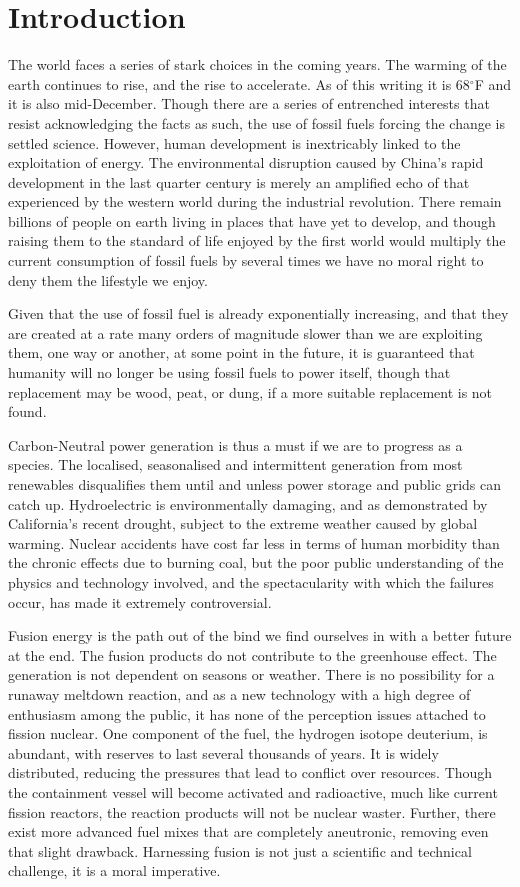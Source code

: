 \chapter{Introduction}
\indent The world faces a series of stark choices in the coming years.  The warming of the earth continues to rise, and the rise to accelerate.  As of this writing it is 68$^{\circ}$F and it is also mid-December.  Though there are a series of entrenched interests that resist acknowledging the facts as such, the use of fossil fuels forcing the change is settled science.  However, human development is inextricably linked to the exploitation of energy.  The environmental disruption caused by China's rapid development in the last quarter century is merely an amplified echo of that experienced by the western world during the industrial revolution.  There remain billions of people on earth living in places that have yet to develop, and though raising them to the standard of life enjoyed by the first world would multiply the current consumption of fossil fuels by several times we have no moral right to deny them the lifestyle we enjoy.\par
Given that the use of fossil fuel is already exponentially increasing, and that they are created at a rate many orders of magnitude slower than we are exploiting them, one way or another, at some point in the future, it is guaranteed that humanity will no longer be using fossil fuels to power itself, though that replacement may be wood, peat, or dung, if a more suitable replacement is not found.\par
Carbon-Neutral power generation is thus a must if we are to progress as a species.  The localised, seasonalised and intermittent generation from most renewables disqualifies them until and unless power storage and public grids can catch up.  Hydroelectric is environmentally damaging, and as demonstrated by California's recent drought, subject to the extreme weather caused by global warming.  Nuclear accidents have cost far less in terms of human morbidity than the chronic effects due to burning coal, but the poor public understanding of the physics and technology involved, and the spectacularity with which the failures occur, has made it extremely controversial.\par
Fusion energy is the path out of the bind we find ourselves in with a better future at the end.  The fusion products do not contribute to the greenhouse effect.  The generation is not dependent on seasons or weather.  There is no possibility for a runaway meltdown reaction, and as a new technology with a high degree of enthusiasm among the public, it has none of the perception issues attached to fission nuclear.  One component of the fuel, the hydrogen isotope deuterium, is abundant, with reserves to last several thousands of years.  It is widely distributed, reducing the pressures that lead to conflict over resources.    Though the containment vessel will become activated and radioactive, much like current fission reactors, the reaction products will not be nuclear waster.  Further, there exist more advanced fuel mixes that are completely aneutronic, removing even that slight drawback.  Harnessing fusion is not just a scientific and technical challenge, it is a moral imperative.

